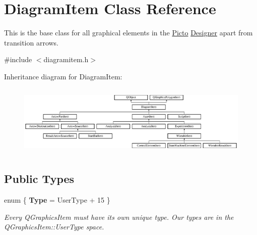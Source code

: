 \hypertarget{class_diagram_item}{\section{Diagram\-Item Class Reference}
\label{class_diagram_item}
}


This is the base class for all graphical elements in the \hyperlink{namespace_picto}{Picto} \hyperlink{class_designer}{Designer} apart from transition arrows.  




{\ttfamily \#include $<$diagramitem.\-h$>$}

Inheritance diagram for Diagram\-Item\-:\begin{figure}[H]
\begin{center}
\leavevmode
\includegraphics[height=3.435583cm]{class_diagram_item}
\end{center}
\end{figure}
\subsection*{Public Types}
\begin{DoxyCompactItemize}
\item 
enum \{ {\bfseries Type} = User\-Type + 15
 \}
\begin{DoxyCompactList}\small\item\em Every Q\-Graphics\-Item must have its own unique type. Our types are in the Q\-Graphics\-Item\-::\-User\-Type space. \end{DoxyCompactList}\end{DoxyCompactItemize}
